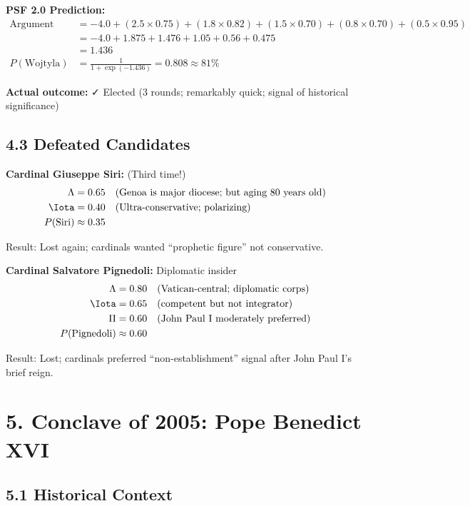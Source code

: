 \documentclass[11pt]{article}
\begin{document}
\textbf{PSF 2.0 Prediction:}
\begin{align*}
\text{Argument} &= -4.0 + (2.5 \times 0.75) + (1.8 \times 0.82) + (1.5 \times 0.70) + (0.8 \times 0.70) + (0.5 \times 0.95) \\
&= -4.0 + 1.875 + 1.476 + 1.05 + 0.56 + 0.475 \\
&= 1.436 \\
P(\text{Wojtyla}) &= \frac{1}{1 + \exp(-1.436)} = 0.808 \approx 81\%
\end{align*}

\textbf{Actual outcome:} ✓ Elected (3 rounds; remarkably quick; signal of historical significance)

\subsection{4.3 Defeated Candidates}

\textbf{Cardinal Giuseppe Siri:} (Third time!)
\begin{align*}
\Lambda &= 0.65 \quad \text{(Genoa is major diocese; but aging 80 years old)} \\
\Iota &= 0.40 \quad \text{(Ultra-conservative; polarizing)} \\
P(\text{Siri}) &\approx 0.35
\end{align*}

Result: Lost again; cardinals wanted ``prophetic figure'' not conservative.

\textbf{Cardinal Salvatore Pignedoli:} Diplomatic insider
\begin{align*}
\Lambda &= 0.80 \quad \text{(Vatican-central; diplomatic corps)} \\
\Iota &= 0.65 \quad \text{(competent but not integrator)} \\
\Pi &= 0.60 \quad \text{(John Paul I moderately preferred)} \\
P(\text{Pignedoli}) &\approx 0.60
\end{align*}

Result: Lost; cardinals preferred ``non-establishment'' signal after John Paul I's brief reign.

\section{5. Conclave of 2005: Pope Benedict XVI}

\subsection{5.1 Historical Context}
\end{document}

